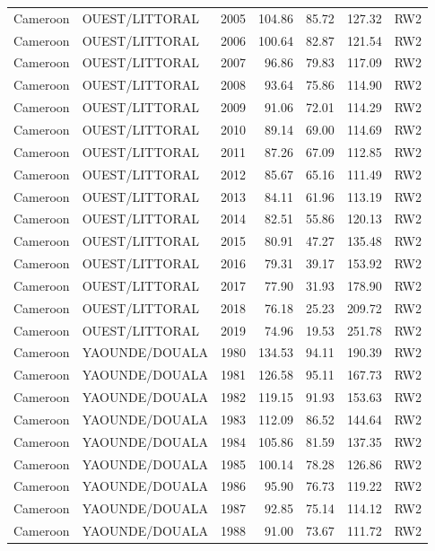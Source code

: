 \begin{longtable}{lllrrrl}
  Cameroon & OUEST/LITTORAL & 2005 & 104.86 & 85.72 & 127.32 & RW2 \\ 
  Cameroon & OUEST/LITTORAL & 2006 & 100.64 & 82.87 & 121.54 & RW2 \\ 
  Cameroon & OUEST/LITTORAL & 2007 & 96.86 & 79.83 & 117.09 & RW2 \\ 
  Cameroon & OUEST/LITTORAL & 2008 & 93.64 & 75.86 & 114.90 & RW2 \\ 
  Cameroon & OUEST/LITTORAL & 2009 & 91.06 & 72.01 & 114.29 & RW2 \\ 
  Cameroon & OUEST/LITTORAL & 2010 & 89.14 & 69.00 & 114.69 & RW2 \\ 
  Cameroon & OUEST/LITTORAL & 2011 & 87.26 & 67.09 & 112.85 & RW2 \\ 
  Cameroon & OUEST/LITTORAL & 2012 & 85.67 & 65.16 & 111.49 & RW2 \\ 
  Cameroon & OUEST/LITTORAL & 2013 & 84.11 & 61.96 & 113.19 & RW2 \\ 
  Cameroon & OUEST/LITTORAL & 2014 & 82.51 & 55.86 & 120.13 & RW2 \\ 
  Cameroon & OUEST/LITTORAL & 2015 & 80.91 & 47.27 & 135.48 & RW2 \\ 
  Cameroon & OUEST/LITTORAL & 2016 & 79.31 & 39.17 & 153.92 & RW2 \\ 
  Cameroon & OUEST/LITTORAL & 2017 & 77.90 & 31.93 & 178.90 & RW2 \\ 
  Cameroon & OUEST/LITTORAL & 2018 & 76.18 & 25.23 & 209.72 & RW2 \\ 
  Cameroon & OUEST/LITTORAL & 2019 & 74.96 & 19.53 & 251.78 & RW2 \\ 
  Cameroon & YAOUNDE/DOUALA & 1980 & 134.53 & 94.11 & 190.39 & RW2 \\ 
  Cameroon & YAOUNDE/DOUALA & 1981 & 126.58 & 95.11 & 167.73 & RW2 \\ 
  Cameroon & YAOUNDE/DOUALA & 1982 & 119.15 & 91.93 & 153.63 & RW2 \\ 
  Cameroon & YAOUNDE/DOUALA & 1983 & 112.09 & 86.52 & 144.64 & RW2 \\ 
  Cameroon & YAOUNDE/DOUALA & 1984 & 105.86 & 81.59 & 137.35 & RW2 \\ 
  Cameroon & YAOUNDE/DOUALA & 1985 & 100.14 & 78.28 & 126.86 & RW2 \\ 
  Cameroon & YAOUNDE/DOUALA & 1986 & 95.90 & 76.73 & 119.22 & RW2 \\ 
  Cameroon & YAOUNDE/DOUALA & 1987 & 92.85 & 75.14 & 114.12 & RW2 \\ 
  Cameroon & YAOUNDE/DOUALA & 1988 & 91.00 & 73.67 & 111.72 & RW2 \\ 

\end{longtable}

